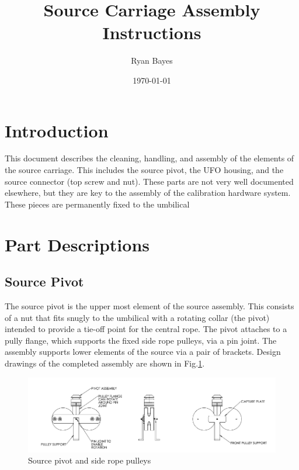 \documentclass[12pt]{article}
\title{Source Carriage Assembly Instructions}
\author{Ryan Bayes}
\date{\today}
\begin{document}
\maketitle
\section{Introduction}

This document describes the cleaning, handling, and assembly of the
elements of the source carriage. This includes the source pivot, the
UFO housing, and the source connector (top screw and nut). These parts
are not very well documented elsewhere, but they are key to the
assembly of the calibration hardware system. These pieces are permanently
fixed to the umbilical

\section{Part Descriptions}

\subsection{Source Pivot}
The source pivot is the upper most element of the source
assembly. This consists of a nut that fits snugly to the umbilical
with a rotating collar (the pivot) intended to provide a tie-off point
for the central rope. The pivot attaches to a pully flange, which
supports the fixed side rope pulleys, via a pin joint. The assembly
supports lower elements of the source via a pair of brackets. Design
drawings of the completed assembly are shown in Fig.\ref{fig:pivot}.

\begin{figure}
  \includegraphics[width=\textwidth]{SourcePivot}
  \caption{Source pivot and side rope pulleys}
  \label{fig:pivot}
\end{figure}
\end{document}
